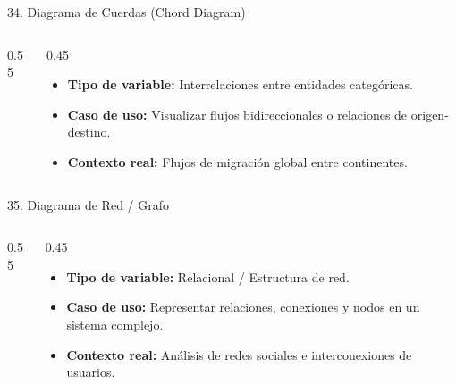 \documentclass[aspectratio=169,10pt]{beamer}
\begin{document}
\begin{frame}{34. Diagrama de Cuerdas (Chord Diagram)}
\begin{columns}
\begin{column}{0.55\textwidth}
\end{column}
\begin{column}{0.45\textwidth}
\begin{itemize}\small
\item \textbf{Tipo de variable:} Interrelaciones entre entidades categóricas.
\item \textbf{Caso de uso:} Visualizar flujos bidireccionales o relaciones de origen-destino.
\item \textbf{Contexto real:} Flujos de migración global entre continentes.
\end{itemize}
\end{column}
\end{columns}
\end{frame}

\begin{frame}{35. Diagrama de Red / Grafo}
\begin{columns}
\begin{column}{0.55\textwidth}
\end{column}
\begin{column}{0.45\textwidth}
\begin{itemize}\small
\item \textbf{Tipo de variable:} Relacional / Estructura de red.
\item \textbf{Caso de uso:} Representar relaciones, conexiones y nodos en un sistema complejo.
\item \textbf{Contexto real:} Análisis de redes sociales e interconexiones de usuarios.
\end{itemize}
\end{column}
\end{columns}
\end{frame}
\end{document}
